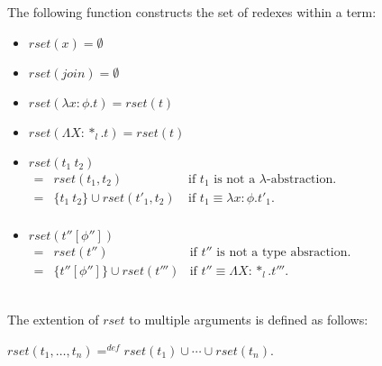 \begin{definition}
  \label{def:rset_ssfe}
  The following function constructs the set of redexes within a term:

  \begin{center}
    \begin{itemize}
    \item[] $rset(x) = \emptyset$\\
    \item[] $rset(join) = \emptyset$
    \item[] $rset(\lambda x:\phi.t) = rset(t)$\\
    \item[] $rset(\Lambda X:*_l.t) = rset(t)$\\
    \item[] $rset(t_1\ t_2)$\\
      \begin{math}
        \begin{array}{lll}
          = & rset(t_1, t_2) & \text{if } t_1 \text{ is not a } \lambda \text{-abstraction.}\\
          = & \{t_1\ t_2\} \cup rset(t'_1, t_2)\ & \text{if } t_1 \equiv \lambda x:\phi.t'_1.\\
        \end{array}
      \end{math}
    \item[] $rset(t''[\phi''])$\\
      \begin{math}
        \begin{array}{lll}
          = & rset(t'') & \text{if } t'' \text{ is not a type absraction.}\\
          = & \{t''[\phi'']\} \cup rset(t''') & \text{if } t'' \equiv \Lambda X:*_l.t'''.
        \end{array}
      \end{math}
    \end{itemize}
  \end{center}
  \ \\
  The extention of $rset$ to multiple arguments is defined as follows:
  \begin{center}
    $rset(t_1, \ldots, t_n) =^{def} rset(t_1) \cup \cdots \cup rset(t_n)$.
  \end{center}
\end{definition}


